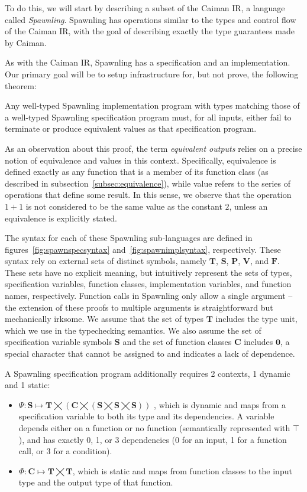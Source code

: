 To do this, we will start by describing a subset of the Caiman IR, a language called \textit{Spawnling}.  Spawnling has operations similar to the types and control flow of the Caiman IR, with the goal of describing exactly the type guarantees made by Caiman.

As with the Caiman IR, Spawnling has a specification and an implementation.  Our primary goal will be to setup infrastructure for, but not prove, the following theorem:
%
\begin{theorem}
Any well-typed Spawnling implementation program with types matching those of a well-typed Spawnling specification program must, for all inputs, either fail to terminate or produce equivalent values as that specification program.
\end{theorem}
%
As an observation about this proof, the term \textit{equivalent outputs} relies on a precise notion of equivalence and values in this context.  Specifically, equivalence is defined exactly as any function that is a member of its function class (as described in subsection~\ref{subsec:equivalence}), while value refers to the series of operations that define some result.  In this sense, we observe that the operation $1+1$ is not considered to be the same value as the constant $2$, unless an equivalence is explicitly stated.

The syntax for each of these Spawnling sub-languages are defined in figures~\ref{fig:spawnspecsyntax} and~\ref{fig:spawnimplsyntax}, respectively.  These syntax rely on external sets of distinct symbols, namely $\mathbf{T}$, $\textbf{S}$, $\textbf{P}$, $\mathbf{V}$, and $\mathbf{F}$.  These sets have no explicit meaning, but intuitively represent the sets of types, specification variables, function classes, implementation variables, and function names, respectively.  Function calls in Spawnling only allow a single argument -- the extension of these proofs to multiple arguments is straightforward but mechanically irksome.  We assume that the set of types $\mathbf{T}$ includes the type $\textrm{unit}$, which we use in the typechecking semantics.  We also assume the set of specification variable symbols $\mathbf{S}$ and the set of function classes $\mathbf{C}$ includes $\mathbf{0}$, a special character that cannot be assigned to and indicates a lack of dependence.

A Spawnling specification program additionally requires 2 contexts, 1 dynamic and 1 static:
\begin{itemize}
\item 
$\Psi:\mathbf{S}\mapsto
\mathbf{T}\bigtimes
\left(\mathbf{C}\bigtimes
\left(\mathbf{S}\bigtimes\mathbf{S}\bigtimes\mathbf{S}\right)
\right)$
, which is dynamic and maps from a specification variable to both its type and its dependencies.  A variable depends either on a function or no function (semantically represented with $\top$), and has exactly 0, 1, or 3 dependencies (0 for an input, 1 for a function call, or 3 for a condition).
\item $\Phi:\mathbf{C}\mapsto\mathbf{T}\bigtimes\mathbf{T}$, which is static and maps from function classes to the input type and the output type of that function.
\end{itemize}

